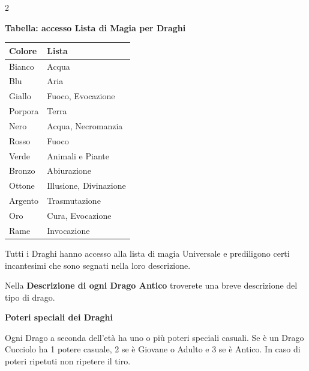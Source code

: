 \begin{multicols}{2}
{\textbf{Tabella: accesso Lista di Magia per Draghi}

\medskip

\noindent\begin{tabularx}{\linewidth}{ll}
\toprule
\rowcolor{gray!20}\textbf{Colore} & \textbf{Lista} \\
\toprule
Bianco & Acqua \\
\rowcolor{gray!20}Blu & Aria \\
Giallo & Fuoco, Evocazione \\
\rowcolor{gray!20}Porpora & Terra \\
Nero & Acqua, Necromanzia \\
\rowcolor{gray!20}Rosso & Fuoco \\
Verde & Animali e Piante \\
\rowcolor{gray!20}Bronzo & Abiurazione \\
Ottone & Illusione, Divinazione \\
\rowcolor{gray!20}Argento & Trasmutazione \\
Oro & Cura, Evocazione \\
\rowcolor{gray!20}Rame & Invocazione \\

\end{tabularx}

\medskip

Tutti i Draghi hanno accesso alla lista di magia Universale e prediligono certi incantesimi che sono segnati nella loro descrizione.

\medskip

Nella \textbf{Descrizione di ogni Drago Antico} troverete una breve descrizione del tipo di drago.

\medskip

\textbf{Poteri speciali dei Draghi}\medskip

Ogni Drago a seconda dell'età ha uno o più poteri speciali casuali.
Se è un Drago Cucciolo ha 1 potere casuale, 2 se è Giovane o Adulto e 3 se è Antico. In caso di poteri ripetuti non ripetere il tiro.

\medskip

}
\end{multicols}
